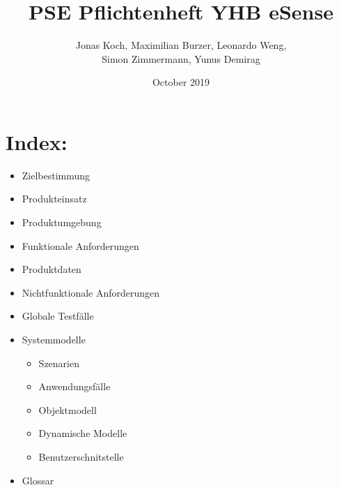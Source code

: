 


	\title{PSE Pflichtenheft YHB eSense}
	\author{Jonas Koch, Maximilian Burzer, Leonardo Weng, \\ Simon Zimmermann, Yunus Demirag}
	\date{October 2019}
	\maketitle
	\newpage
		\section{Index:}
		\begin{itemize}
			\item Zielbestimmung
			\item Produkteinsatz
			\item Produktumgebung
			\item Funktionale Anforderungen
			\item Produktdaten
			\item Nichtfunktionale Anforderungen
			\item Globale Testfälle
			\item Systemmodelle
			\begin{itemize}
				\item Szenarien
				\item Anwendungsfälle
				\item Objektmodell
				\item Dynamische Modelle
				\item Benutzerschnitstelle
			\end{itemize}
			\item Glossar
		\end{itemize}
	\newpage